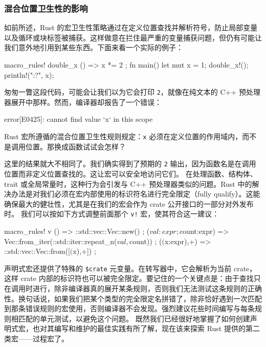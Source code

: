 \subsubsection{混合位置卫生性的影响}
\label{idx:idx_0e135f1e}
如前所述，Rust 的宏卫生性策略通过在定义位置查找并解析符号，防止局部变量以及循环或块标签被捕获。这样做意在拦住最严重的变量捕获问题，但仍有可能让我们意外地引用到某些东西。下面来看一个实际的例子：
\begin{codebox}[rust]
macro_rules! double_x {
    () => {
        x *= 2
    };
}
fn main() {
    let mut x = 1;
    double_x!();
    println!("{:?}", x);
}
\end{codebox}
匆匆一瞥这段代码，可能会让我们以为它会打印 \texttt{2}，就像在纯文本的 C++ 预处理器展开中那样。然而，编译器却报告了一个错误：
\begin{codeboxdark}
error[E0425]: cannot find value `x` in this scope
\end{codeboxdark}
Rust 宏所遵循的混合位置卫生性规则规定：\texttt{x} 必须在定义位置的作用域内，而不是调用位置。那换成函数试试会怎样？
这里的结果就大不相同了。我们确实得到了预期的 \texttt{2} 输出，因为函数名是在调用位置而非定义位置查找的。这让宏可以安全地访问它们。
\label{idx:idx_f0c40cd1}
在处理函数、结构体、trait 或全局常量时，这种行为会引发与 C++ 预处理器类似的问题。Rust 中的解决办法是对我们必须在宏内部使用的标识符名进行完全限定（fully qualify）。这能确保最大的健壮性，尤其是在我们的宏会作为 crate 公开接口的一部分对外发布时。
我们可以按如下方式调整前面那个 \texttt{v!} 宏，使其符合这一建议：
\begin{codebox}[rust]
macro_rules! v {
  () => { ::std::vec::Vec::new() };
  ($val:expr; $count:expr) =>
    { Vec::from_iter(::std::iter::repeat_n($val, $count)) };
  ($($x:expr),+) => { ::std::vec::Vec::from([$($x),+]) };
}
\end{codebox}
声明式宏还提供了特殊的 \texttt{\$crate} 元变量。在转写器中，它会解析为当前 crate，这样 crate 内部的标识符也可以被完全限定。要记住的一个关键点是：由于查找只在调用时进行，除非编译器真的展开某条规则，否则我们无法测试这条规则的正确性。换句话说，如果我们把某个类型的完全限定名拼错了，除非恰好遇到一次匹配到那条错误规则的宏使用，否则编译器不会发现。强烈建议花些时间编写与每条规则相匹配的单元测试，以避免这个问题。
\label{idx:idx_f999fafb}
既然我们已经很好地掌握了如何创建声明式宏，也对其编写和维护的最佳实践有所了解，现在该来探索 Rust 提供的第二类宏——过程宏了。
